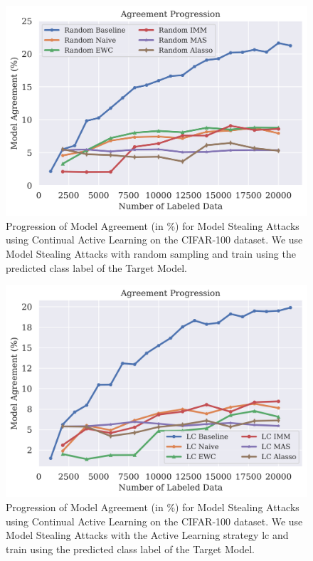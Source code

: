 \begin{figure}[h]
    \centering
    \includegraphics[width=0.7\linewidth]{images/results_CALMS/cifar100_label_random.png}
    \caption[Agreement Comparison for Model Stealing on CIFAR100 using the predicted class label and the Active Learning strategy Random]{Progression of Model
    Agreement (in \%) for Model Stealing Attacks using Continual Active Learning on the CIFAR-100 dataset. We use Model Stealing Attacks with random sampling
    and train using the predicted class label of the Target Model.}
    \label{fig:CALMSCIFAR100LabelRandom}
\end{figure}

\begin{figure}[h]
    \centering
    \includegraphics[width=0.7\linewidth]{images/results_CALMS/cifar100_label_lc.png}
    \caption[Agreement Comparison for Model Stealing on CIFAR100 using the predicted class label and the Active Learning strategy LC]{Progression of Model
    Agreement (in \%) for Model Stealing Attacks using Continual Active Learning on the CIFAR-100 dataset. We use Model Stealing Attacks with the Active Learning
    strategy \gls{lc} and train using the predicted class label of the Target Model.}
    \label{fig:CALMSCIFAR100LabelLC}
\end{figure}

